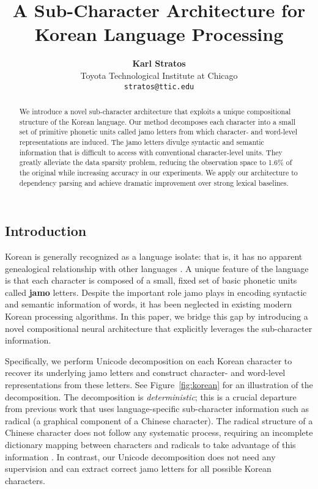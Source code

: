 \documentclass[11pt,letterpaper]{article}
\title{A Sub-Character Architecture for Korean Language Processing}
\author{
  {\bf Karl Stratos} \\
  Toyota Technological Institute at Chicago \\
  {\tt stratos@ttic.edu}
  }
\date{}
\begin{document}
\maketitle
\begin{CJK}{UTF8}{gbsn}


\begin{abstract}

We introduce a novel sub-character architecture that exploits a unique compositional structure of the Korean language.
Our method decomposes each character into a small set of primitive phonetic units called jamo letters from which character- and word-level representations are induced.
The jamo letters divulge syntactic and semantic information that is difficult to access with conventional character-level units.
They greatly alleviate the data sparsity problem, reducing the observation space to 1.6\% of the original while increasing accuracy in our experiments.
We apply our architecture to dependency parsing and achieve dramatic improvement over strong lexical baselines.

\end{abstract}

\section{Introduction}
\label{sec:intro}

Korean is generally recognized as a language isolate: that is, it has no apparent genealogical relationship with other languages \cite{song2006korean,campbell2007glossary}.
A unique feature of the language is that each character is composed of a small, fixed set of basic phonetic units called \textbf{jamo} letters.
Despite the important role jamo plays in encoding syntactic and semantic information of words,
it has been neglected in existing modern Korean processing algorithms.
In this paper, we bridge this gap by introducing a novel compositional neural architecture that explicitly leverages the sub-character information.

Specifically, we perform Unicode decomposition on each Korean character to recover its underlying jamo letters and construct character- and word-level
representations from these letters.
See Figure~\ref{fig:korean} for an illustration of the decomposition.
The decomposition is \textit{deterministic}; this is a crucial departure from previous work that uses
language-specific sub-character information such as radical (a graphical component of a Chinese character).
The radical structure of a Chinese character does not follow any systematic process,
requiring an incomplete dictionary mapping between characters and radicals to take advantage of this information \citep{sun2014radical,yinmulti}.
In contrast, our Unicode decomposition does not need any supervision and can extract correct jamo letters for all possible Korean characters.


\end{CJK}
\end{document}
